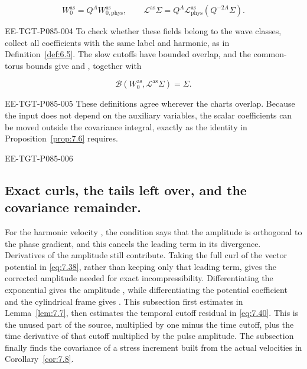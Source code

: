 \[
  W_0^{\mathrm{as}}=Q^A W_{0,\mathrm{phys}}^{\mathrm{as}},
  \qquad
  \mathcal L^{\mathrm{as}}\Sigma
  =Q^A\mathcal L_{\mathrm{phys}}^{\mathrm{as}}(Q^{-2A}\Sigma).
\]
\begin{EESegment}{EE-TGT-P085-004}
To check whether these fields belong to the wave classes, collect all coefficients with the same
label and harmonic, as in Definition~\ref{def:6.5}. The slow cutoffs have bounded overlap, and
the common-torus bounds give  and
, together with
\end{EESegment}
\begin{equation}
  \mathcal B(W_0^{\mathrm{as}},\mathcal L^{\mathrm{as}}\Sigma)=\Sigma.
\tag{7.36}\label{eq:7.36}
\end{equation}
\begin{EESegment}{EE-TGT-P085-005}
These definitions agree wherever the charts overlap. Because the input does not depend on the
auxiliary variables, the scalar coefficients can be moved outside the covariance integral, exactly
as the identity in Proposition~\ref{prop:7.6} requires.
\end{EESegment}

\begin{EESegment}{EE-TGT-P085-006}
\subsection{Exact curls, the tails left over, and the covariance remainder.}\label{sec:7.4}
For the harmonic velocity
, the condition
 says that the amplitude is orthogonal to the phase
gradient, and this cancels the leading term in its divergence. Derivatives of the amplitude
 still contribute. Taking the full curl of the vector potential
 in \eqref{eq:7.38}, rather than keeping only that
leading term, gives the corrected amplitude  needed for exact
incompressibility. Differentiating the exponential gives the amplitude
, while differentiating the potential coefficient
 and the cylindrical frame gives . This
subsection first estimates  in Lemma~\ref{lem:7.7}, then estimates the
temporal cutoff residual in \eqref{eq:7.40}. This is the unused part of the source, multiplied by
one minus the time cutoff, plus the time derivative of that cutoff multiplied by the pulse
amplitude. The subsection finally finds the covariance of a stress increment
built from the actual velocities in Corollary~\ref{cor:7.8}.
\end{EESegment}

